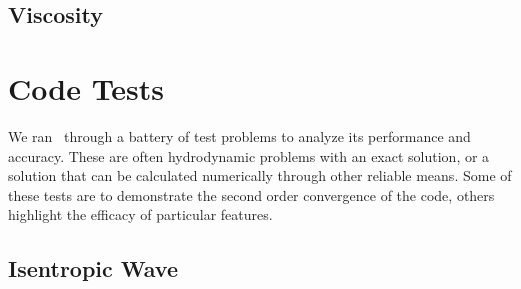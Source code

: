 \subsection{Viscosity}

\section{Code Tests}

We ran \grdisco\ through a battery of test problems to analyze its performance and accuracy.  These are often hydrodynamic problems with an exact solution, or a solution that can be calculated numerically through other reliable means.  Some of these tests are to demonstrate the second order convergence of the code, others highlight the efficacy of particular features.

\subsection{Isentropic Wave}

